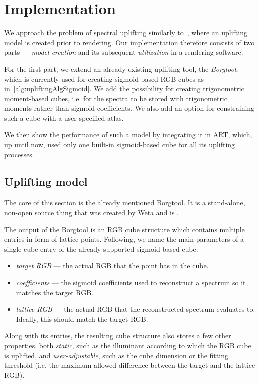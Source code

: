 \chapter{Implementation}

We approach the problem of spectral uplifting similarly to~\citet{upsamplingJakobHanika}, where an uplifting model is created prior to rendering. Our implementation therefore consists of two parts --- \emph{model creation} and its subsequent \emph{utilization} in a rendering software. 

For the first part, we extend an already existing uplifting tool, the \emph{Borgtool}, which is currently used for creating sigmoid-based RGB cubes as in~\cref{alg:upliftingAlgSigmoid}. We add the possibility for creating trigonometric moment-based cubes, i.e. for the spectra to be stored with trigonometric moments rather than sigmoid coefficients. We also add an option for constraining such a cube with a user-specified atlas.

We then show the performance of such a model by integrating it in ART, which, up until now, used only one built-in sigmoid-based cube for all its uplifting processes.

\section{Uplifting model}

The core of this section is the already mentioned Borgtool. It is a stand-alone, non-open source thing that was created by Weta and is .

The output of the Borgtool is an RGB cube structure which contains multiple entries in form of lattice points. Following, we name the main parameters of a single cube entry of the already supported sigmoid-based cube:
\begin{itemize}
	\item \emph{target RGB} --- the actual RGB that the point has in the cube.
	\item \emph{coefficients} --- the sigmoid coefficients used to reconstruct a spectrum so it matches the target RGB.
	\item \emph{lattice RGB} --- the actual RGB that the reconstructed spectrum evaluates to. Ideally, this should match the target RGB.
\end{itemize}
Along with its entries, the resulting cube structure also stores a few other properties, both \emph{static}, such as the illuminant according to which the RGB cube is uplifted, and \emph{user-adjustable}, such as the cube dimension or the fitting threshold (i.e. the maximum allowed difference between the target and the lattice RGB).

